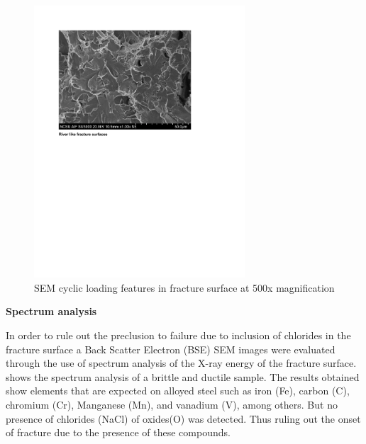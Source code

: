 \begin{figure}[htbp]
	\centering
	\includegraphics[width=0.7\textwidth]{VAC Thesis 2.0/Chapter-4/figs/BBT_RiverFeatures.pdf}
	\caption{SEM cyclic loading features in fracture surface at 500x magnification}
	\label{fig:RiverFeatures}
\end{figure}

\newpage
\textbf{Spectrum analysis}

In order to rule out the preclusion to failure due to inclusion of chlorides in the fracture surface a Back Scatter Electron (BSE) SEM images were evaluated through the use of spectrum analysis of the X-ray energy of the fracture surface.  shows the spectrum analysis of a brittle and ductile sample. The results obtained show elements that are expected on alloyed steel such as iron (Fe), carbon (C), chromium (Cr), Manganese (Mn), and vanadium (V), among others. But no presence of chlorides (NaCl) of oxides(O) was detected. Thus ruling out the onset of fracture due to the presence of these compounds.

